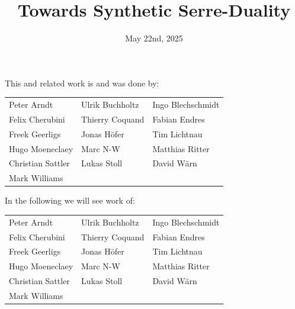 \documentclass{beamer}
\title{Towards Synthetic Serre-Duality}
\date{May 22nd, 2025}
\newcommand{\nop}[1]{\textcolor{bg}{#1}}
\begin{document}
\begin{frame}
  \titlepage
\end{frame}

\begin{frame}
  This and related work is and was done by:
  \begin{center}
    \begin{tabularx}{\textwidth}{XXX}
      Peter Arndt & Ulrik Buchholtz & Ingo Blechschmidt \\
      Felix Cherubini & Thierry Coquand & Fabian Endres \\
      Freek Geerligs & Jonas Höfer & Tim Lichtnau \\
      Hugo Moeneclaey & Marc N-W & Matthias Ritter \\
      Christian Sattler & Lukas Stoll & David Wärn \\
      Mark Williams & & 
    \end{tabularx}
  \end{center}
\end{frame}

\begin{frame}
  In the following we will see work of:
  \begin{center}
    \begin{tabularx}{\textwidth}{XXX}
      \nop{Peter Arndt} & \nop{Ulrik Buchholtz} & Ingo Blechschmidt \\
      Felix Cherubini & Thierry Coquand & Fabian Endres \\
      \nop{Freek Geerligs} & \nop{Jonas Höfer} & \nop{Tim Lichtnau} \\
      Hugo Moeneclaey & \nop{Marc N-W} & Matthias Ritter \\
      \nop{Christian Sattler} & \nop{Lukas Stoll} & David Wärn \\
      \nop{Mark Williams} & & 
    \end{tabularx}
  \end{center}
\end{frame}
\end{document}
